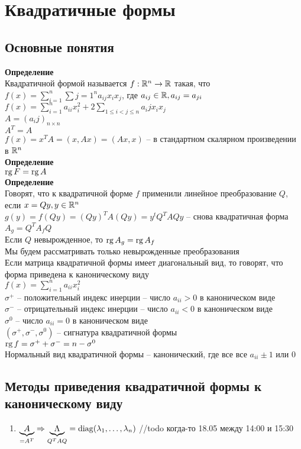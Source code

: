 \documentclass[12pt]{article}
\begin{document}
\section{Квадратичные формы}
\subsection{Основные понятия}
\textbf{Определение}\\
Квадратичной формой называется $f: \Rset^n \rto \Rset$ такая, что $f(x) = \sum_{i=1}^n \sum{j=1}^n a_{ij}x_ix_j$, где $a_{ij} \in \Rset, a_{ij} = a_{ji}$\\
$f(x) = \sum_{i=1}^n a_{ii}x_i^2 + 2 \sum_{1 \leq i < j \leq n} a_ij x_ix_j$\\
$A = (a_ij)_{n\times n}$\\
$A^T = A$\\
$f(x) = x^T A  = (x, Ax) = (Ax, x)$ -- в стандартном скалярном произведении в $\Rset^n$\\
\textbf{Определение}\\
$\rg F = \rg A$\\
\textbf{Определение}\\
Говорят, что к квадратичной форме $f$ применили линейное преобразование $Q$, если $x = Qy, y \in \Rset^n$\\
$g(y) = f(Qy) = (Qy)^TA(Qy) = y^t Q^TAQy$ -- снова квадратичная форма\\
$A_g = Q^T A_f Q$\\
Если $Q$ невырожденное, то $\rg A_g = \rg A_f$\\
Мы будем рассматривать только невырожденные преобразования\\
Если матрица квадратичной формы имеет диагональный вид, то говорят, что форма приведена к каноническому виду\\
$f(x) = \sum_{i=1}^n a_{ii}x_i^2$\\
$\sigma^+$ -- положительный индекс инерции -- число $a_{ii} > 0$ в каноническом виде\\
$\sigma^-$ -- отрицательный индекс инерции -- число $a_{ii} < 0$ в каноническом виде\\
$\sigma^0$ -- число $a_{ii} = 0$ в каноническом виде\\
$(\sigma^+, \sigma^-, \sigma^0)$ -- сигнатура квадратичной формы\\
$\rg f = \sigma^+ + \sigma^- = n - \sigma^0$\\
Нормальный вид квадратичной формы -- канонический, где все все $a_{ii} \pm1$ или $0$\\
\subsection{Методы приведения квадратичной формы к каноническому виду}
\begin{enumerate}
    \item $\ub{=A^T}A\Rto \ub{Q^TAQ}\Lambda = \nm{diag}(\lambda_1, \ldots, \lambda_n)$
    //todo когда-то 18.05 между 14:00 и 15:30
\end{enumerate}
\end{document}

